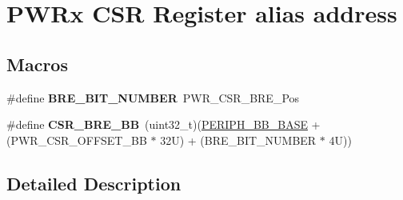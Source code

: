 \hypertarget{group___p_w_r_ex___c_s_r__register__alias}{}\section{P\+W\+Rx C\+SR Register alias address}
\label{group___p_w_r_ex___c_s_r__register__alias}
\subsection*{Macros}
\begin{DoxyCompactItemize}
\item 
\mbox{\label{group___p_w_r_ex___c_s_r__register__alias_gabe84749fda066b71a64a1eec61032181}} 
\#define {\bfseries B\+R\+E\+\_\+\+B\+I\+T\+\_\+\+N\+U\+M\+B\+ER}~P\+W\+R\+\_\+\+C\+S\+R\+\_\+\+B\+R\+E\+\_\+\+Pos
\item 
\mbox{\label{group___p_w_r_ex___c_s_r__register__alias_ga1451a5ec810860a7c2e28c23f0c0e928}} 
\#define {\bfseries C\+S\+R\+\_\+\+B\+R\+E\+\_\+\+BB}~(uint32\+\_\+t)(\hyperlink{group___peripheral__memory__map_gaed7efc100877000845c236ccdc9e144a}{P\+E\+R\+I\+P\+H\+\_\+\+B\+B\+\_\+\+B\+A\+SE} + (P\+W\+R\+\_\+\+C\+S\+R\+\_\+\+O\+F\+F\+S\+E\+T\+\_\+\+BB $\ast$ 32\+U) + (\+B\+R\+E\+\_\+\+B\+I\+T\+\_\+\+N\+U\+M\+B\+E\+R $\ast$ 4\+U))
\end{DoxyCompactItemize}


\subsection{Detailed Description}
